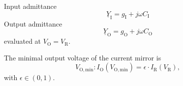 \documentclass{article}[11pt]
\begin{document}
Input admittance
\begin{equation}
\underline{Y}_{\mathrm{I}} = g_{\mathrm{I}} + j \omega C_{\mathrm{I}}
\end{equation}
Output admittance
\begin{equation}
\underline{Y}_{\mathrm{O}} = g_{\mathrm{O}} + j \omega C_{\mathrm{O}}
\end{equation}
evaluated at $V_{\mathrm{O}}=V_{\mathrm{R}}$.



The minimal output voltage of the current mirror is
\begin{equation}
V_{\mathrm{O,min}} : I_{\mathrm{O}}\left(V_{\mathrm{O,min}}\right) = \epsilon \cdot I_{\mathrm{R}}\left(V_{\mathrm{R}}\right),
\end{equation}
with $\epsilon \in (0,1)$.


\printbibliography
\end{document}
